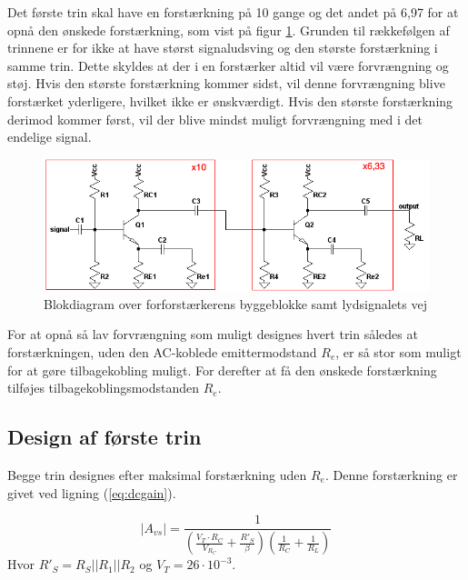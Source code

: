 Det første trin skal have en forstærkning på 10 gange og det andet på 6,97 for at opnå den ønskede forstærkning, som vist på figur \ref{blok_forforstaerker}. Grunden til rækkefølgen af trinnene er for ikke at have størst signaludsving og den største forstærkning i samme trin. Dette skyldes at der i en forstærker altid vil være forvrængning og støj. Hvis den største forstærkning kommer sidst, vil denne forvrængning blive forstærket yderligere, hvilket ikke er ønskværdigt. Hvis den største forstærkning derimod kommer først, vil der blive mindst muligt forvrængning med i det endelige signal.

\begin{figure}[h]
\centering
\includegraphics[scale=.6]{teknisk/forforstaerker/blok_forforstaerker.png}
\caption{Blokdiagram over forforstærkerens byggeblokke samt lydsignalets vej}
\label{blok_forforstaerker}
\end{figure}

For at opnå så lav forvrængning som muligt designes hvert trin således at forstærkningen, uden den AC-koblede emittermodstand $R_e$, er så stor som muligt for at gøre tilbagekobling muligt. For derefter at få den ønskede forstærkning tilføjes tilbagekoblingsmodstanden $R_e$.

\subsection*{Design af første trin}
Begge trin designes efter maksimal forstærkning uden $R_e$. Denne forstærkning er givet ved ligning (\ref{eq:dcgain}).

\begin{equation}
|A_{vs}|=\frac{1}{\left(\frac{V_T \cdot R_C}{V_{R_C}}+\frac{R'_S}{\beta}\right) \left(\frac{1}{R_C}+\frac{1}{R_L}\right)}
\label{eq:dcgain}
\end{equation}
Hvor $R'_S = R_S||R_1||R_2$ og $V_T = 26 \cdot 10^{-3}$.

